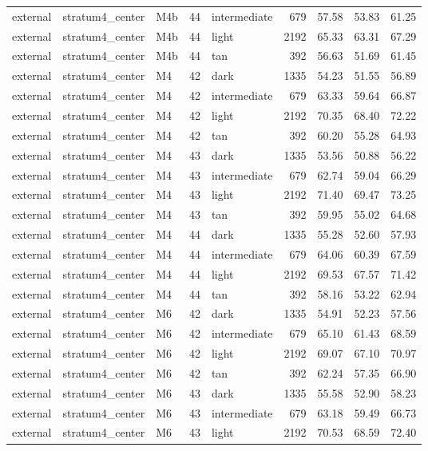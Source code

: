 \begin{tabular}{lllrlrrrr}
external & stratum4\_center & M4b & 44 & intermediate & 679 & 57.58 & 53.83 & 61.25 \\
external & stratum4\_center & M4b & 44 & light & 2192 & 65.33 & 63.31 & 67.29 \\
external & stratum4\_center & M4b & 44 & tan & 392 & 56.63 & 51.69 & 61.45 \\
external & stratum4\_center & M4 & 42 & dark & 1335 & 54.23 & 51.55 & 56.89 \\
external & stratum4\_center & M4 & 42 & intermediate & 679 & 63.33 & 59.64 & 66.87 \\
external & stratum4\_center & M4 & 42 & light & 2192 & 70.35 & 68.40 & 72.22 \\
external & stratum4\_center & M4 & 42 & tan & 392 & 60.20 & 55.28 & 64.93 \\
external & stratum4\_center & M4 & 43 & dark & 1335 & 53.56 & 50.88 & 56.22 \\
external & stratum4\_center & M4 & 43 & intermediate & 679 & 62.74 & 59.04 & 66.29 \\
external & stratum4\_center & M4 & 43 & light & 2192 & 71.40 & 69.47 & 73.25 \\
external & stratum4\_center & M4 & 43 & tan & 392 & 59.95 & 55.02 & 64.68 \\
external & stratum4\_center & M4 & 44 & dark & 1335 & 55.28 & 52.60 & 57.93 \\
external & stratum4\_center & M4 & 44 & intermediate & 679 & 64.06 & 60.39 & 67.59 \\
external & stratum4\_center & M4 & 44 & light & 2192 & 69.53 & 67.57 & 71.42 \\
external & stratum4\_center & M4 & 44 & tan & 392 & 58.16 & 53.22 & 62.94 \\
external & stratum4\_center & M6 & 42 & dark & 1335 & 54.91 & 52.23 & 57.56 \\
external & stratum4\_center & M6 & 42 & intermediate & 679 & 65.10 & 61.43 & 68.59 \\
external & stratum4\_center & M6 & 42 & light & 2192 & 69.07 & 67.10 & 70.97 \\
external & stratum4\_center & M6 & 42 & tan & 392 & 62.24 & 57.35 & 66.90 \\
external & stratum4\_center & M6 & 43 & dark & 1335 & 55.58 & 52.90 & 58.23 \\
external & stratum4\_center & M6 & 43 & intermediate & 679 & 63.18 & 59.49 & 66.73 \\
external & stratum4\_center & M6 & 43 & light & 2192 & 70.53 & 68.59 & 72.40 \\

\end{tabular}
